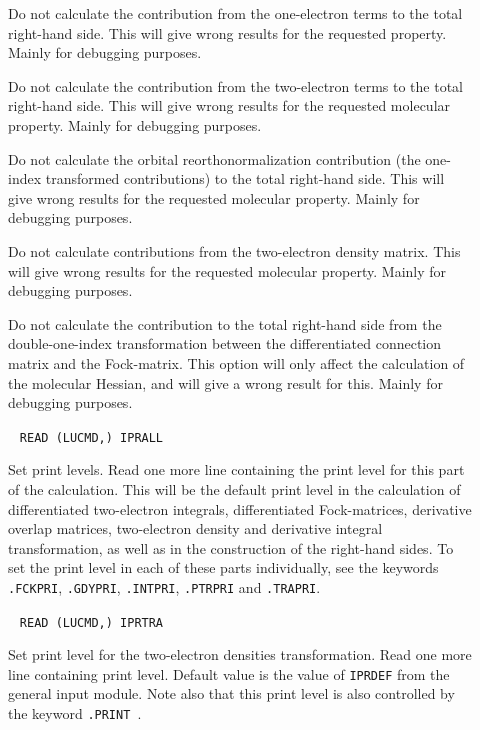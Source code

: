 \begin{description}
\item[] Do not calculate the contribution from the
one-electron terms to the total right-hand side. This will give wrong
results for the requested property. Mainly for debugging purposes.

\item[] Do not calculate the contribution from the
two-electron terms to the total right-hand side. This will give wrong
results for the requested molecular property. Mainly for debugging
purposes.

\item[] Do not calculate the orbital reorthonormalization
contribution (the one-index transformed contributions) to the total
right-hand side. This will give wrong results for the requested
molecular property. Mainly for debugging purposes.

\item[] Do not calculate contributions from the two-electron
density matrix. This will give wrong results for the requested
molecular property. Mainly for debugging purposes.

\item[] Do not calculate the contribution to the total
right-hand side from the double-one-index
transformation between the differentiated connection matrix and the
Fock-matrix. This option will only affect the calculation of the molecular
Hessian, and will give a wrong result for this. Mainly for debugging
purposes.

\item[]\verb| |\newline
\verb|READ (LUCMD,) IPRALL|

Set print levels.  Read one more line containing the print level for
this part of the calculation.  This will be the default print
level in the calculation of differentiated two-electron integrals,
differentiated Fock-matrices, derivative
overlap matrices, two-electron density and derivative integral
transformation, as well as in the construction of the right-hand sides.
To set the print level in each of these parts individually, see the
keywords \verb|.FCKPRI|, \verb|.GDYPRI|, \verb|.INTPRI|,
\verb|.PTRPRI| and \verb|.TRAPRI|.

\item[]\verb| |\newline
\verb|READ (LUCMD,) IPRTRA|

Set print level for the  two-electron densities transformation. Read
one more line containing print level.
Default value is the value of  \verb|IPRDEF| from the general input
module. Note also that this print level is also controlled by the keyword
\verb|.PRINT |.


\end{description}
